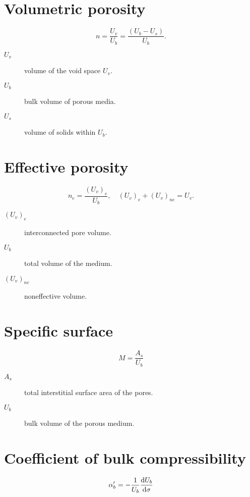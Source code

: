 \documentclass[
paper=a5paper,
fontsize=15]{scrreport}
\begin{document}
\section{Volumetric porosity}

\begin{equation*}
\boxed{
n = 
\frac{U_{v}}{U_{b}} = 
\frac{\left(U_{b}-U_{s}\right)}{U_{b}}.
}
\end{equation*}

\begin{description}
	\item[$U_{v}$] volume of the void space $U_{v}$.
	\item[$U_{b}$] bulk volume of porous media.
	\item[$U_{s}$] volume of solids within $U_{b}$.
\end{description}

\section{Effective porosity}

\begin{equation*}
	n_{e} =
	\frac{\left(U_{v}\right)_{e}}{U_{b}},\quad
	\left(U_{v}\right)_{e} + \left(U_{v}\right)_{ne} = U_{v}.
\end{equation*}

\begin{description}
	\item[$\left(U_{v}\right)_{e}$] interconnected pore volume.
	\item[$U_{b}$] total volume of the medium.
	\item[$\left(U_{v}\right)_{ne}$] noneffective volume.
\end{description}

\section{Specific surface}

\begin{equation*}
M = \frac{A_{s}}{U_{b}}
\end{equation*}

\begin{description}
	\item[$A_{s}$] total interstitial surface area of the pores.
	\item[$U_{b}$] bulk volume of the porous medium.
\end{description}

\section{Coefficient of bulk compressibility}

\begin{equation*}
	\alpha^{\prime}_{b} =
	-\frac{1}{U_{b}}\diff{U_{b}}{\sigma}
\end{equation*}
\end{document}
